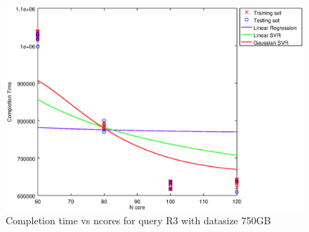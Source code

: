 
\begin {figure}[hbtp]
\centering
\includegraphics[width=\textwidth]{output/R3_750_1_OVER_NCORES/plot_R3_750_bestmodels.eps}
\caption{Completion time vs ncores for query R3 with datasize 750GB}
\label{fig:all_nonlinear_R3_750}
\end {figure}
